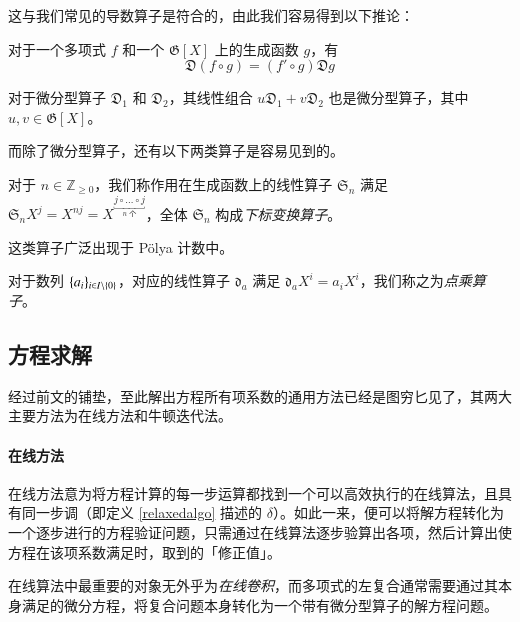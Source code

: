 这与我们常见的导数算子是符合的，由此我们容易得到以下推论：

\begin{lemma}
对于一个多项式 $f$ 和一个 $\mathfrak G[X]$ 上的生成函数 $g$，有
$$
\mathfrak D (f\circ g) = (f' \circ g) \mathfrak D g
$$
\end{lemma}

\begin{lemma} \label{der}
对于微分型算子 $\mathfrak D_1$ 和 $\mathfrak D_2$，其线性组合 $u\mathfrak D_1 + v\mathfrak D_2$ 也是微分型算子，其中 $u,v\in \mathfrak G[X]$。
\end{lemma}

而除了微分型算子，还有以下两类算子是容易见到的。

\begin{definition}[下标变换算子]
对于 $n\in \mathbb Z_{\ge 0}$，我们称作用在生成函数上的线性算子 $\mathfrak S_n$ 满足 $\mathfrak S_n X^j = X^{nj} = X^{\underbracket{j\circ \dots\circ j}_{\text{$n$ 个}}}$，全体 $\mathfrak S_n$ 构成\emph{下标变换算子}。
\end{definition}

这类算子广泛出现于 P\"olya 计数中。

\begin{definition}[点乘算子]
对于数列 $\{a_i\}_{i\in {I \backslash \{0\}}}$，对应的线性算子 $\mathfrak d_a$ 满足 $\mathfrak d_a X^i = a_iX^i$，我们称之为\emph{点乘算子}。
\end{definition}

\subsection{方程求解}

经过前文的铺垫，至此解出方程所有项系数的通用方法已经是图穷匕见了，其两大主要方法为在线方法和牛顿迭代法。

\paragraph{在线方法}

在线方法意为将方程计算的每一步运算都找到一个可以高效执行的在线算法，且具有同一步调（即定义 \ref{relaxedalgo} 描述的 $\delta$）。如此一来，便可以将解方程转化为一个逐步进行的方程验证问题，只需通过在线算法逐步验算出各项，然后计算出使方程在该项系数满足时，取到的「修正值」。

在线算法中最重要的对象无外乎为\emph{在线卷积}，而多项式的左复合通常需要通过其本身满足的微分方程，将复合问题本身转化为一个带有微分型算子的解方程问题。

